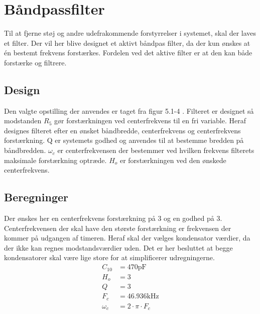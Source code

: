 \section{Båndpassfilter}\label{sec:filter}
Til at fjerne støj og andre udefrakommende forstyrrelser i systemet, skal der laves et filter.
Der vil her blive designet et aktivt båndpas filter, da der kun ønskes at én bestemt frekvens forstærkes.
Fordelen ved det aktive filter er at den kan både forstærke og filtrere.

\subsection{Design}
Den valgte opstilling der anvendes er taget fra figur 5.1-4 \cite[side. 208]{Huelsman1993}.
Filteret er designet så modstanden $R_5$ gør forstærkningen ved centerfrekvens til en fri variable.
Heraf designes filteret efter en ønsket båndbredde, centerfrekvens og centerfrekvens forstærkning. Q er systemets godhed og anvendes til at bestemme bredden på båndbredden. 
$\omega_c$ er centerfrekvensen der bestemmer ved hvilken frekvens filterets maksimale forstærkning optræde.
$H_o$ er forstærkningen ved den ønskede centerfrekvens.

\subsection{Beregninger}
Der ønskes her en centerfrekvens forstærkning på 3 og en godhed på 3. 
Centerfrekvensen der skal have den største forstærkning er frekvensen der kommer på udgangen af timeren.
Heraf skal der vælges kondensator værdier, da der ikke kan regnes modstandsværdier uden. 
Det er her besluttet at begge kondensatorer skal være lige store for at simplificerer udregningerne.
\begin{align}
	C_{10} & = 470 \si{\pico\farad} \nonumber \\
	H_o & = 3 \nonumber \\
	Q & = 3 \nonumber \\
	F_c & = 46.936 \si{\kilo\hertz} \nonumber \\
	\omega_c & = 2 \cdot \pi \cdot F_c
\end{align}

